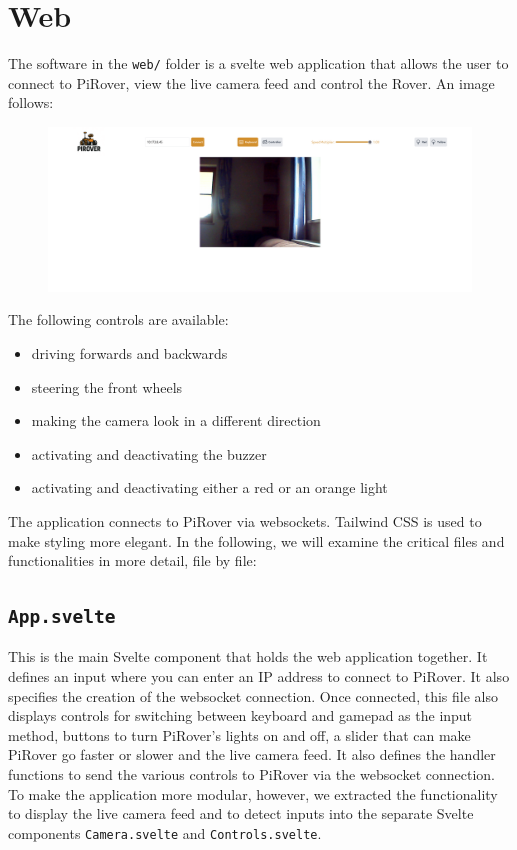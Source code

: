\section{Web}

The software in the \texttt{web/} folder is a svelte web application that allows the user to connect to PiRover, view the live camera feed and control the Rover. An image follows:

\begin{figure}[H]
    \centering
    \includegraphics[width=\linewidth]{img/web}
\end{figure}

The following controls are available:

\begin{itemize}
    \item driving forwards and backwards
    \item steering the front wheels
    \item making the camera look in a different direction
    \item activating and deactivating the buzzer
    \item activating and deactivating either a red or an orange light
\end{itemize}

The application connects to PiRover via websockets. Tailwind CSS is used to make styling more elegant. In the following, we will examine the critical files and functionalities in more detail, file by file:

\subsection*{\texttt{App.svelte}}

This is the main Svelte component that holds the web application together. It defines an input where you can enter an IP address to connect to PiRover. It also specifies the creation of the websocket connection. Once connected, this file also displays controls for switching between keyboard and gamepad as the input method, buttons to turn PiRover's lights on and off, a slider that can make PiRover go faster or slower and the live camera feed. It also defines the handler functions to send the various controls to PiRover via the websocket connection. To make the application more modular, however, we extracted the functionality to display the live camera feed and to detect inputs into the separate Svelte components \texttt{Camera.svelte} and \texttt{Controls.svelte}.

